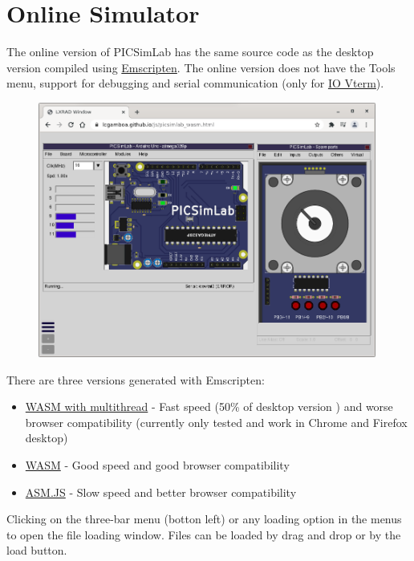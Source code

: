 \chapter{Online Simulator}

The online version of PICSimLab has the same source code as the desktop version compiled using 
\href{https://emscripten.org/}{Emscripten}. The online version does not have the Tools menu, support for 
debugging and serial communication (only for \hyperlink{def:vterm}{IO Vterm}). 

\begin{figure}[H]
\center
\includegraphics[width=0.99\textwidth]{img/online.png} 
\end{figure} 

There are three versions generated with Emscripten: 

\begin{itemize}
\item \href{https://lcgamboa.github.io/js/picsimlab_mt.html}{WASM with multithread} - Fast speed (50\% of desktop version )
and worse browser compatibility (currently only tested and work in Chrome and Firefox desktop)
\item \href{https://lcgamboa.github.io/js/picsimlab_wasm.html}{WASM} - Good speed and good browser compatibility
\item \href{https://lcgamboa.github.io/js/picsimlab_asmjs.html}{ASM.JS} - Slow speed and better browser compatibility
\end{itemize}

Clicking on the three-bar menu (botton left) or any loading option in the menus to open the 
file loading window.
Files can be loaded by drag and drop or by the load button. 

